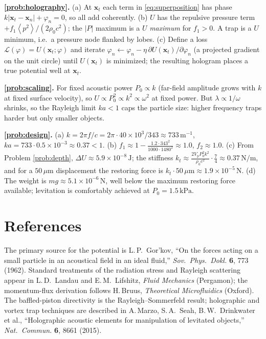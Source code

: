 \documentclass[11pt]{article}
\newcommand{\rrho}{\rho_{0}}
\newcommand{\vp}{V_{\mathrm{p}}}
\newcommand{\avg}[1]{\left\langle #1 \right\rangle}
\newcommand{\vpSq}{\avg{p^{2}}}
\newcommand{\xx}{\mathbf{x}}
\begin{document}
\textbf{\ref{prob:holography}.} (a) At $\xx_t$ each term in
\eqref{eq:superposition} has phase $k|\xx_t-\xx_n|+\varphi_n=0$, so all add
coherently. (b) $U$ has the repulsive pressure term $+f_1\vpSq/(2\rrho c^2)$;
the $|P|$ maximum is a $U$ \emph{maximum} for $f_1>0$. A trap is a $U$
minimum, i.e.\ a pressure node flanked by lobes. (c) Define a loss
$\mathcal L(\varphi)=U(\xx_t;\varphi)$ and iterate
$\varphi_n\leftarrow\varphi_n-\eta\,\partial U(\xx_t)/\partial\varphi_n$ (a
projected gradient on the unit circle) until $U(\xx_t)$ is minimized; the
resulting hologram places a true potential well at $\xx_t$.

\textbf{\ref{prob:scaling}.} For fixed acoustic power
$P_0\propto k$ (far-field amplitude grows with $k$ at fixed surface velocity),
so $U\propto P_0^2\propto k^2\propto\omega^2$ at fixed power. But
$\lambda\propto1/\omega$ shrinks, so the Rayleigh limit $ka<1$ caps the particle
size: higher frequency traps harder but only smaller objects.

\textbf{\ref{prob:design}.} (a)
$k=2\pi f/c=2\pi\cdot40\times10^3/343\approx733\,\mathrm{m^{-1}}$,
$ka=733\cdot0.5\times10^{-3}\approx0.37<1$. (b)
$f_1\approx1-\frac{1.2\cdot343^2}{1000\cdot1480^2}\approx1.0$,
$f_2\approx1.0$. (c) From Problem \ref{prob:depth},
$\Delta U\approx5.9\times10^{-8}\,\mathrm{J}$; the stiffness
$k_t\approx\frac{2\vp P_0^2k^2}{\rrho c^2}\cdot\frac74\approx0.37\,\mathrm{N/m}$,
and for a $50\,\mu\mathrm{m}$ displacement the restoring force is
$k_t\cdot50\,\mu\mathrm{m}\approx1.9\times10^{-5}\,\mathrm{N}$. (d) The weight
is $mg\approx5.1\times10^{-6}\,\mathrm{N}$, well below the maximum restoring
force available; levitation is comfortably achieved at $P_0=1.5\,\mathrm{kPa}$.

\section*{References}

The primary source for the potential is L.\,P.~Gor'kov, ``On the forces acting
on a small particle in an acoustical field in an ideal fluid,'' \emph{Sov.\
Phys.\ Dokl.} \textbf{6}, 773 (1962). Standard treatments of the radiation
stress and Rayleigh scattering appear in L.\,D.~Landau and E.\,M.~Lifshitz,
\emph{Fluid Mechanics} (Pergamon); the momentum-flux derivation follows
H.\,Bruus, \emph{Theoretical Microfluidics} (Oxford). The baffled-piston
directivity is the Rayleigh--Sommerfeld result; holographic and vortex trap
techniques are described in A.\,Marzo, S.\,A.~Seah, B.\,W.~Drinkwater et al.,
``Holographic acoustic elements for manipulation of levitated objects,''
\emph{Nat.\ Commun.} \textbf{6}, 8661 (2015).
\end{document}
